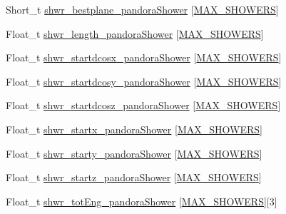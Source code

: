 \begin{DoxyCompactItemize}
\item 
Short\-\_\-t \hyperlink{classanatree_a99196947abdb04ecee264cc94ba3f56c}{shwr\-\_\-bestplane\-\_\-pandora\-Shower} \mbox{[}\hyperlink{anatree__core__v09410002_8h_aa8deaf72f1f7bd4b88c7d1ea07590801}{M\-A\-X\-\_\-\-S\-H\-O\-W\-E\-R\-S}\mbox{]}
\item 
Float\-\_\-t \hyperlink{classanatree_a25f8167d5d6d8bccae6eaaf20861db72}{shwr\-\_\-length\-\_\-pandora\-Shower} \mbox{[}\hyperlink{anatree__core__v09410002_8h_aa8deaf72f1f7bd4b88c7d1ea07590801}{M\-A\-X\-\_\-\-S\-H\-O\-W\-E\-R\-S}\mbox{]}
\item 
Float\-\_\-t \hyperlink{classanatree_ad2da912ae8730c9261b025e26dc8a318}{shwr\-\_\-startdcosx\-\_\-pandora\-Shower} \mbox{[}\hyperlink{anatree__core__v09410002_8h_aa8deaf72f1f7bd4b88c7d1ea07590801}{M\-A\-X\-\_\-\-S\-H\-O\-W\-E\-R\-S}\mbox{]}
\item 
Float\-\_\-t \hyperlink{classanatree_a19f91eeda026c0a4e84949b5b41bdbcc}{shwr\-\_\-startdcosy\-\_\-pandora\-Shower} \mbox{[}\hyperlink{anatree__core__v09410002_8h_aa8deaf72f1f7bd4b88c7d1ea07590801}{M\-A\-X\-\_\-\-S\-H\-O\-W\-E\-R\-S}\mbox{]}
\item 
Float\-\_\-t \hyperlink{classanatree_aa2f9c21b50a61e815117c89f832657d0}{shwr\-\_\-startdcosz\-\_\-pandora\-Shower} \mbox{[}\hyperlink{anatree__core__v09410002_8h_aa8deaf72f1f7bd4b88c7d1ea07590801}{M\-A\-X\-\_\-\-S\-H\-O\-W\-E\-R\-S}\mbox{]}
\item 
Float\-\_\-t \hyperlink{classanatree_a8ad73ace138eccdebf1dcc157accd27a}{shwr\-\_\-startx\-\_\-pandora\-Shower} \mbox{[}\hyperlink{anatree__core__v09410002_8h_aa8deaf72f1f7bd4b88c7d1ea07590801}{M\-A\-X\-\_\-\-S\-H\-O\-W\-E\-R\-S}\mbox{]}
\item 
Float\-\_\-t \hyperlink{classanatree_aa65384df0a529cfa840a1fb79211983c}{shwr\-\_\-starty\-\_\-pandora\-Shower} \mbox{[}\hyperlink{anatree__core__v09410002_8h_aa8deaf72f1f7bd4b88c7d1ea07590801}{M\-A\-X\-\_\-\-S\-H\-O\-W\-E\-R\-S}\mbox{]}
\item 
Float\-\_\-t \hyperlink{classanatree_abef515b0658219775cdd05053b343bff}{shwr\-\_\-startz\-\_\-pandora\-Shower} \mbox{[}\hyperlink{anatree__core__v09410002_8h_aa8deaf72f1f7bd4b88c7d1ea07590801}{M\-A\-X\-\_\-\-S\-H\-O\-W\-E\-R\-S}\mbox{]}
\item 
Float\-\_\-t \hyperlink{classanatree_a772288aae2df1fc9162a8f82db33c5d3}{shwr\-\_\-tot\-Eng\-\_\-pandora\-Shower} \mbox{[}\hyperlink{anatree__core__v09410002_8h_aa8deaf72f1f7bd4b88c7d1ea07590801}{M\-A\-X\-\_\-\-S\-H\-O\-W\-E\-R\-S}\mbox{]}\mbox{[}3\mbox{]}
\item 

\end{DoxyCompactItemize}
